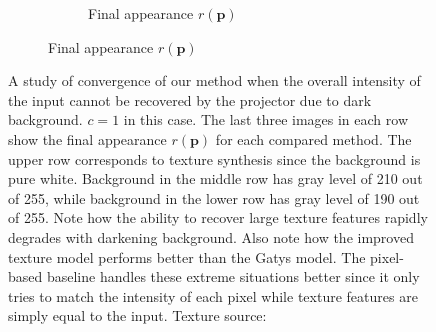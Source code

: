 \begin{figure}[]
\begin{subfigure}{\textwidth}
\begin{subfigure}{0.6\textwidth}
\begin{subfigure}{0.32\textwidth}
            \end{subfigure}
            \hfill
            \begin{subfigure}{0.32\textwidth}
                \centering
            \end{subfigure}
            \caption*{Final appearance \(r(\bm{p})\)}
            \vspace*{5mm}
        \end{subfigure}
        
    \end{subfigure}
    \caption{A study of convergence of our method when the overall intensity of the input cannot be recovered by the projector due to dark background. \(c = 1\) in this case. The last three images in each row show the final appearance \(r(\bm{p})\) for each compared method. The upper row corresponds to texture synthesis since the background is pure white. Background in the middle row has gray level of 210 out of 255, while background in the lower row has gray level of 190 out of 255. Note how the ability to recover large texture features rapidly degrades with darkening background. Also note how the improved texture model performs better than the Gatys model. The pixel-based baseline handles these extreme situations better since it only tries to match the intensity of each pixel while texture features are simply equal to the input. Texture source: \citet{Pixar128}}
    \label{fig:ex02-issues}
\end{figure}


